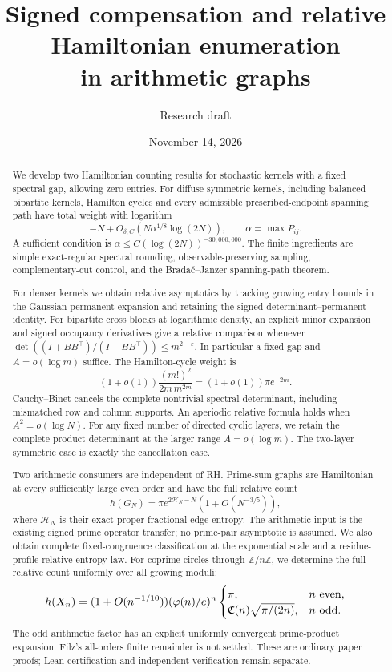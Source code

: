 \documentclass[11pt]{article}
\title{Signed compensation and relative Hamiltonian enumeration\\
in arithmetic graphs}
\author{Research draft}
\date{November 14, 2026}
\theoremstyle{remark}
\begin{document}
\maketitle
\begin{abstract}
We develop two Hamiltonian counting results for stochastic kernels
with a fixed spectral gap, allowing zero entries.
For diffuse symmetric kernels, including balanced bipartite kernels,
Hamilton cycles and every admissible prescribed-endpoint spanning
path have total weight with logarithm
\[
 -N+O_{\delta,C}(N\alpha^{1/8}\log(2N)),
 \qquad \alpha=\max P_{ij}.
\]
A sufficient condition is
\(\alpha\leq C(\log(2N))^{-30,000,000}\).
The finite ingredients are simple exact-regular spectral rounding,
observable-preserving sampling, complementary-cut control, and
the Brada\v{c}--Janzer spanning-path theorem.

For denser kernels we obtain relative asymptotics by tracking
growing entry bounds in the Gaussian permanent expansion and
retaining the signed determinant--permanent identity.
For bipartite cross blocks at logarithmic density, an explicit
minor expansion and signed occupancy derivatives give a relative
comparison whenever
\(\det((I+BB^\top)/(I-BB^\top))\leq m^{2-\varepsilon}\).
In particular a fixed gap and \(A=o(\log m)\) suffice.
The Hamilton-cycle weight is
\[
 (1+o(1))\frac{(m!)^2}{2m\,m^{2m}}
                  =(1+o(1))\pi e^{-2m}.
\]
Cauchy--Binet cancels the complete nontrivial spectral determinant,
including mismatched row and column supports.
An aperiodic relative formula holds when \(A^2=o(\log N)\).
For any fixed number of directed cyclic layers, we retain the
complete product determinant at the larger range \(A=o(\log m)\).
The two-layer symmetric case is exactly the cancellation case.

Two arithmetic consumers are independent of RH.
Prime-sum graphs are Hamiltonian at every sufficiently large even
order and have the full relative count
\[
 h(G_N)=\pi e^{2\mathcal H_N-N}(1+O(N^{-3/5})),
\]
where \(\mathcal H_N\) is their exact proper fractional-edge entropy.
The arithmetic input is the existing signed prime operator transfer;
no prime-pair asymptotic is assumed.
We also obtain complete fixed-congruence classification at the
exponential scale and a residue-profile relative-entropy law.
For coprime circles through \(\mathbb Z/n\mathbb Z\), we determine
the full relative count uniformly over all growing moduli:
\[
 h(X_n)=(1+O(n^{-1/10}))(\varphi(n)/e)^n
 \begin{cases}
 \pi,& n\ {\rm even},\\
 \mathfrak C(n)\sqrt{\pi/(2n)},& n\ {\rm odd}.
 \end{cases}
\]
The odd arithmetic factor has an explicit uniformly convergent
prime-product expansion.
Filz's all-orders finite remainder is not settled.
These are ordinary paper proofs; Lean certification and independent
verification remain separate.
\end{abstract}
\end{document}
